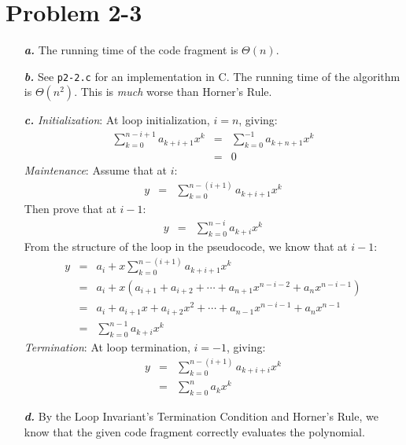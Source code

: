 \documentclass{article}
\begin{document}
\section*{Problem 2-3}

\noindent\begin{enumerate}
	\item[\textbf{\textit{a.}}]
		The running time of the code fragment is $\Theta(n)$.

	\item[\textbf{\textit{b.}}]
		See \texttt{p2-2.c} for an implementation in C. The running time of the algorithm is $\Theta(n^2)$. This is \textit{much} worse than Horner's Rule.

	\item[\textbf{\textit{c.}}]
		\textit{Initialization}: At loop initialization, $i=n$, giving:
		\begin{eqnarray*}
			\sum_{k=0}^{n-i+1} a_{k+i+1} x^k & = & \sum_{k=0}^{-1} a_{k+n+1} x^k \\
			& = & 0
		\end{eqnarray*}
		\textit{Maintenance}: Assume that at $i$:
		\begin{eqnarray*}
			y & = & \sum_{k=0}^{n-(i+1)} a_{k+i+1} x^k
		\end{eqnarray*}
		Then prove that at $i-1$:
		\begin{eqnarray*}
			y & = & \sum_{k=0}^{n-i} a_{k+i} x^k
		\end{eqnarray*}
		From the structure of the loop in the pseudocode, we know that at $i-1$:
		\begin{eqnarray*}
			y & = & a_i + x \sum_{k=0}^{n-(i+1)} a_{k+i+1} x^k \\
			& = & a_i + x \left ( a_{i+1} + a_{i+2} + \cdots + a_{n+1} x^{n-i-2} + a_n x^{n-i-1} \right ) \\
			& = & a_i + a_{i+1} x + a_{i+2} x^2 + \cdots + a_{n-1} x^{n-i-1} + a_n x^{n-1} \\
			& = & \sum_{k=0}^{n-1} a_{k+i} x^k
		\end{eqnarray*}
		\textit{Termination}: At loop termination, $i=-1$, giving:
		\begin{eqnarray*}
			y & = & \sum_{k=0}^{n-(i+1)} a_{k+i+i} x^k \\
			& = & \sum_{k=0}^n a_k x^k
		\end{eqnarray*}

	\item[\textbf{\textit{d.}}] By the Loop Invariant's Termination Condition and Horner's Rule, we know that the given code fragment correctly evaluates the polynomial.
\end{enumerate}
\end{document}
